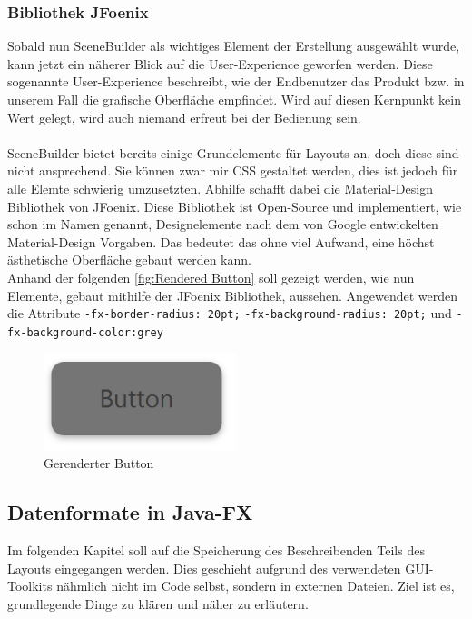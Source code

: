 \subsubsection{Bibliothek JFoenix}
Sobald nun SceneBuilder als wichtiges Element der Erstellung ausgewählt wurde, kann jetzt ein näherer Blick auf die User-Experience geworfen werden.
Diese sogenannte User-Experience beschreibt, wie der Endbenutzer das Produkt bzw. in unserem Fall die grafische Oberfläche empfindet.
Wird auf diesen Kernpunkt kein Wert gelegt, wird auch niemand erfreut bei der Bedienung sein.\\\\
SceneBuilder bietet bereits einige Grundelemente für Layouts an, doch diese sind nicht ansprechend.
Sie können zwar mir CSS gestaltet werden, dies ist jedoch für alle Elemte schwierig umzusetzten.
Abhilfe schafft dabei die Material-Design Bibliothek von JFoenix.
Diese Bibliothek ist Open-Source und implementiert, wie schon im Namen genannt, Designelemente nach dem von Google entwickelten Material-Design Vorgaben.
Das bedeutet das ohne viel Aufwand, eine höchst ästhetische Oberfläche gebaut werden kann.\\
Anhand der folgenden \autoref{fig:Rendered Button} soll gezeigt werden, wie nun Elemente, gebaut mithilfe der JFoenix Bibliothek, aussehen.
Angewendet werden die Attribute \lstinline{-fx-border-radius: 20pt;}  \lstinline{-fx-background-radius: 20pt;} und \lstinline{-fx-background-color:grey}
\begin{figure}[htb!]
    \centering
    \includegraphics[width=0.5\textwidth]{fig/ainf/RenderedButton.PNG}
    \caption{Gerenderter Button}
    \label{fig:Rendered Button}
\end{figure}
\subsection{Datenformate in Java-FX}\label{subsec:datenformate-in-java-fx}
Im folgenden Kapitel soll auf die Speicherung des Beschreibenden Teils des Layouts eingegangen werden.
Dies geschieht aufgrund des verwendeten GUI-Toolkits nähmlich nicht im Code selbst, sondern in externen Dateien.
Ziel ist es, grundlegende Dinge zu klären und näher zu erläutern.
